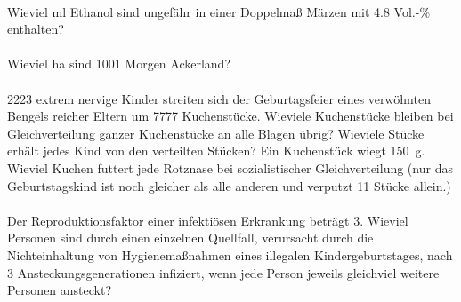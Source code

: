 \documentclass[paper=A4, pagesize, DIV=calc, smallheadings,
fontsize=11pt, expansion=false]{scrreprt}
\begin{document}
\paragraph{}
Wieviel ml Ethanol sind ungefähr in einer Doppelmaß Märzen mit \num{4.8} Vol.-\%  enthalten?

\paragraph{}
Wieviel ha sind 1001 Morgen Ackerland?

\paragraph{}
2223 extrem nervige Kinder streiten sich der Geburtagsfeier eines verwöhnten Bengels reicher Eltern um 7777 
Kuchenstücke. 
Wieviele Kuchenstücke bleiben bei Gleichverteilung ganzer Kuchenstücke an alle Blagen übrig? 
Wieviele Stücke erhält jedes Kind von den verteilten Stücken? Ein Kuchenstück wiegt \SI{150}{g}. Wieviel Kuchen futtert 
jede Rotznase bei 
sozialistischer Gleichverteilung (nur das Geburtstagskind ist noch gleicher als alle anderen und verputzt 11 Stücke 
allein.)

\paragraph{}
Der Reproduktionsfaktor einer infektiösen Erkrankung beträgt 3. Wieviel Personen sind durch einen einzelnen Quellfall,
verursacht durch die Nichteinhaltung von Hygienemaßnahmen eines illegalen Kindergeburtstages, 
nach 3 Ansteckungsgenerationen infiziert, wenn jede Person jeweils gleichviel weitere Personen ansteckt?
\end{document}
